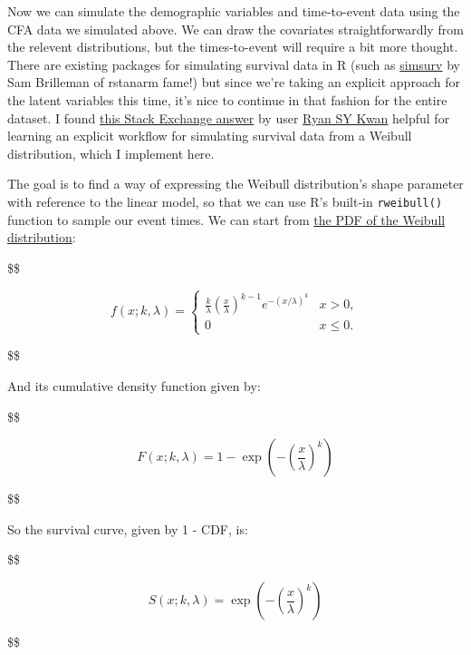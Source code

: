 \documentclass[
  letterpaper,
  DIV=11,
  numbers=noendperiod]{scrreprt}
\begin{document}
Now we can simulate the demographic variables and time-to-event data
using the CFA data we simulated above. We can draw the covariates
straightforwardly from the relevent distributions, but the
times-to-event will require a bit more thought. There are existing
packages for simulating survival data in R (such as
\href{https://cran.r-project.org/web/packages/simsurv/vignettes/simsurv_usage.html}{simsurv}
by Sam Brilleman of rstanarm fame!) but since we're taking an explicit
approach for the latent variables this time, it's nice to continue in
that fashion for the entire dataset. I found
\href{https://stats.stackexchange.com/a/472260/337075}{this Stack
Exchange answer} by user
\href{https://stats.stackexchange.com/users/206635/ryan-sy-kwan}{Ryan SY
Kwan} helpful for learning an explicit workflow for simulating survival
data from a Weibull distribution, which I implement here.

The goal is to find a way of expressing the Weibull distribution's shape
parameter with reference to the linear model, so that we can use R's
built-in \texttt{rweibull()} function to sample our event times. We can
start from \href{https://en.wikipedia.org/wiki/Weibull_distribution}{the
PDF of the Weibull distribution}:

\$\$

\begin{equation}
f(x; k, \lambda) = \begin{cases}
\frac{k}{\lambda} \left( \frac{x}{\lambda} \right)^{k-1} e^{-(x/\lambda)^{k}} & x > 0, \\
0 & x \leq 0.
\end{cases}
\end{equation}

\$\$

And its cumulative density function given by:

\$\$

\begin{equation}
F(x; k, \lambda) = 1 - \exp\left(-\left(\frac{x}{\lambda}\right)^{k}\right)
\end{equation}

\$\$

So the survival curve, given by 1 - CDF, is:

\$\$

\begin{equation}
S(x; k, \lambda) = \exp\left(-\left(\frac{x}{\lambda}\right)^{k}\right)
\end{equation}

\$\$
\end{document}
